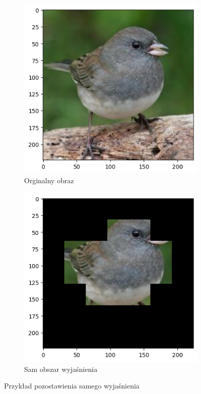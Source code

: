 \begin{figure}
	\begin{subfigure}[b]{0.45\textwidth}
		\centering\includegraphics[width=.9\textwidth]{img/parameters/quality/base}
		\caption{Orginalny obraz}  \label{rys:parameters_lime_numsamples_1000}
	\end{subfigure}
	\begin{subfigure}[b]{0.45\textwidth}
		\centering\includegraphics[width=.9\textwidth]{img/parameters/quality/mask}
		\caption{Sam obszar wyjaśnienia}  \label{rys:parameters_lime_numsamples_1000}
	\end{subfigure}
	\caption{Przykład pozostawienia samego wyjaśnienia}
\end{figure}

